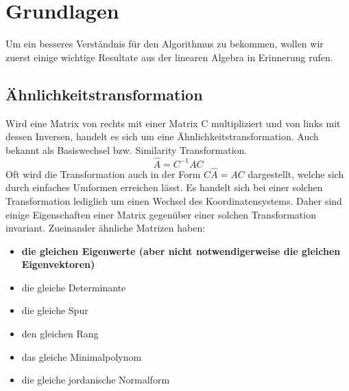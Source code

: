 %
%
%
\section{Grundlagen\label{francis:section:grundlagen}}
Um ein besseres Verständnis für den Algorithmus zu bekommen, wollen wir zuerst einige wichtige Resultate aus der linearen Algebra in Erinnerung rufen.

\subsection{Ähnlichkeitstransformation\label{francis:section:grundlagen:aehnlichkeitstransform}}
Wird eine Matrix von rechts mit einer Matrix C multipliziert und von links mit dessen Inversen, handelt es sich um eine Ähnlichkeitstransformation. 
Auch bekannt als Basiswechsel bzw. Similarity Transformation.
\begin{equation}
	\hat{A}=C^{-1}AC
\end{equation}
Oft wird die Transformation auch in der Form $C\hat{A}=AC$ dargestellt, welche sich durch einfaches Umformen erreichen lässt.
Es handelt sich bei einer solchen Transformation lediglich um einen Wechsel des Koordinatensystems.
Daher sind einige Eigenschaften einer Matrix gegenüber einer solchen Transformation invariant.
Zueinander ähnliche Matrizen haben:
\begin{itemize}
	\item \textbf{die gleichen Eigenwerte (aber nicht notwendigerweise die gleichen Eigenvektoren)}
	\item die gleiche Determinante
	\item die gleiche Spur
	\item den gleichen Rang
	\item das gleiche Minimalpolynom
	\item die gleiche jordanische Normalform
\end{itemize}

